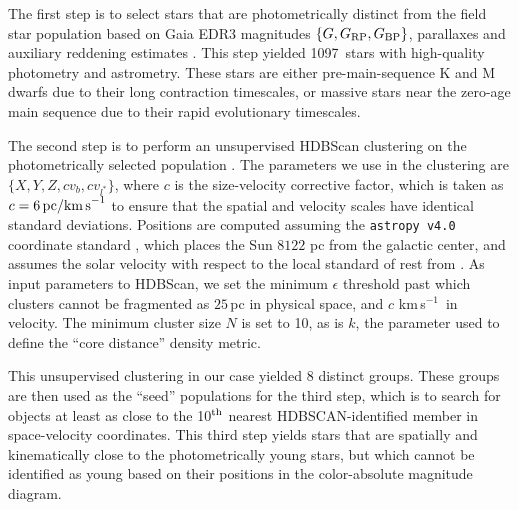\documentclass[12pt,twocolumn]{aastex63}
\newcommand{\npms}{1097} %
\newcommand{\kms}{\,km\,s$^{-1}$}
\begin{document}
The first step is to select stars that are photometrically distinct
from the field star population based on Gaia EDR3 magnitudes $\{G,
G_{\rm RP}, G_{\rm BP}\}$, parallaxes and auxiliary reddening
estimates \citep{lallement_gaia-2mass_2019}.  This step yielded \npms\
stars with high-quality photometry and astrometry.  These stars are
either pre-main-sequence K and M dwarfs due to their long contraction
timescales, or massive stars near the zero-age main sequence due to
their rapid evolutionary timescales.

The second step is to perform an unsupervised HDBScan clustering on
the photometrically selected population
\citep{campello_hierarchical_2015,mcinnes_hdbscan_2017}.  The
parameters we use in the clustering are $\{ X, Y, Z, c v_b, c v_{l^*}
\} $, where $c$ is the size-velocity corrective factor, which is taken
as $c=6\,{\rm pc / km\,s}^{-1}$ to ensure that the spatial and
velocity scales have identical standard deviations.  Positions are
computed assuming the \texttt{astropy v4.0} coordinate standard
\citep{astropy_2018}, which places the Sun $8122$ pc from the galactic
center, and assumes the solar velocity with respect to the local
standard of rest from \citet{schonrich_local_2010}.  As input
parameters to HDBScan, we set the minimum $\epsilon$ threshold past
which clusters cannot be fragmented as $25$\,pc in physical space, and
$c$\,\kms\ in velocity.  The minimum cluster size $N$ is set to 10, as
is $k$, the parameter used to define the ``core distance'' density
metric. 

This unsupervised clustering in our case yielded 8 distinct groups.
These groups are then used as the ``seed'' populations for the third
step, which is to search for objects at least as close to the 10$^{\rm
th}$ nearest HDBSCAN-identified member in space-velocity coordinates.
This third step yields stars that are spatially and kinematically
close to the photometrically young stars, but which cannot be
identified as young based on their positions in the color-absolute
magnitude diagram.
\end{document}
